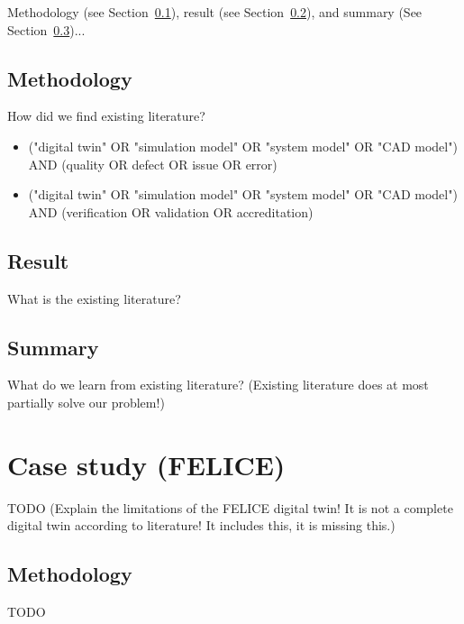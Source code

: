 \documentclass[9pt,conference]{IEEEtran}
\begin{document}
    Methodology (see Section~\ref{section:liteature_methodology}), result (see Section~\ref{section:liteature_result}), and summary (See Section~\ref{section:liteature_summary})...

    \subsection{Methodology}
    \label{section:liteature_methodology}

    How did we find existing literature?
    
    \begin{itemize}
        \item ("digital twin" OR "simulation model" OR "system model" OR "CAD model") AND (quality OR defect OR issue OR error)
        \item ("digital twin" OR "simulation model" OR "system model" OR "CAD model") AND (verification OR validation OR accreditation)
    \end{itemize}

    \subsection{Result}
    \label{section:liteature_result}

    What is the existing literature?

    \subsection{Summary}
    \label{section:liteature_summary}

    What do we learn from existing literature?
    (Existing literature does at most partially solve our problem!)

    \section{Case study (FELICE)}
    \label{section:case}

    TODO (Explain the limitations of the FELICE digital twin! It is not a complete digital twin according to literature! It includes this, it is missing this.)

    \subsection{Methodology}
    \label{section:case_methodology}

    TODO
\end{document}
